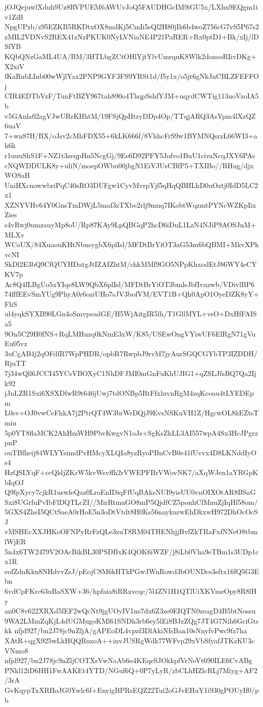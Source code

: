 jOJQejuwlXduh9Uz8RVPUEM6AWUvJoQ5FAUDHGcIM9iGU5x/LXlm9EQgm1iv1ZiB
NpgUPzb/z95EZKB5RKDtxOX8mdKj5CmIi5sQl2H80jIh6b4woZ756cG7vS5P67s2
zMIL2VDNvS2REX41zNzPKUK0NyLVNiaNE4P21PaRER+Rx0ptD1+Bk/xIj/lDSfYB
KQbQNzGaML4UA/BM/3HTLbgZCtOHlYjtYlvUmrquK8Wlk2dozooRIivDKg+X2xiV
fKaRubLIub00wWjlYax2PNP9GYF3FS9YRSt1d/f5y1x/o5jt6gNkJnCBLZFEFFOj
CIR4EDTbVzF/TunFtBZY967tah890o4ThqpSshfYJM+uqydCWTig113uoVzoIA5b
v5GAnla02agVJwURrKHhtM/19FSjQpHtryDDp4Op/TTqjARQ3AsYpm4lXzQZ6uaV
7+wn87H/BX/oJsv2cMhFDX55+6kLK666f/8VhhcFrS9w1BYMNQsrzL66WI3+ah6k
r1uuuShS1F+NZ1t3zeqpHn5NcgGj/9Ee6D92PFY5Jofvo1BuU1civaNcqJXY6PAs
cNQWDDULK8y+uliN/moepOWbu00jbgN1EiVJUsCBfP5+TXIBo//RHug/djxWOSaH
UniHXcnowwbriPqC40sRO3DUFgw1CyvMvrpYjf5qHqQBHLhD0uOztj0IdD5LC2x1
XZNYVHv64Y0GnsTmDWjL5maf3zTXbe2rlj9muq7IKobtWqzmtPYNcWZKpIixZies
s4vRwj0umzauyMp8oU/Rp87KAy9LpQBGqP2hcD6iDuL1LzN4NJiP9AOSJnM+MLXv
WCoUX/84XuaouKHtNbnsygbX6plIsl/MFDtBrYiOT3aG53m6bQBMI+MkvXPkvcNI
SkDl2E3bQ9CfQUYHDatgJtIZAIZhtM/chkMMf9GO5NPpKhxodEtJ86WY4eCYKV7p
Ac8Q4fLBgUo5xYIqe8LW9QbX6plIsl/MFDtBrYiOT3bmlsJbfIvuzwb/VDivlBP6
74fffEEvSmYUg9PhyA0r6oziUHo7sJV3bofVM/EVT1B+Qh0ApO1OyeDZK8yY+FhS
ul4yqkSYXB90LGn4oSmvpeadGE/H5WjAitgIR5lh/T1GllMYL+vsO+DxHfFAISa5
9On5C29H0fNS+RqLMHuzq0kNmE3xW/K85/USEwOngVYiwUF6ElRgN71gVuEu05vz
3uCgAB4j2qOFdfR7WpPHDR/opbR7RwpbJ9rvM7jyAurSGQCGYbTP3IZDDH/RjuTT
7j34wQll6JCCI45YCsVBOXyC1NhDFJMI0mGnFuKhUJIG1+qZSLJfzBQ7Qa2Ijk92
jJnLZR1Sxi6XSXDfwR9t646jUwj7tdONBp5RtFfxluvnRgM4zqKcoau4tLYEDEpm
L0sv+OJ0vwCeFhkA7j2PtrQT4W3brWrDQjJ9EvsNSKuVH1Z/HgcwOL8kEZtsTmiu
5p0YT8flaMCK2AhHmWH9PbvKwgvN1oJs+SgKsZhLL3AI557wpA4Sx3HcJPgrzpnP
ouTBfheij84WLYYsimdPvHMcyXLQIa8yzRyoPBnCvB0e41fUvvx4D8LKNddIyOs4
HzQSLYqF+ccQldjZKrW5kvWsvffh2rVWEPFBrVWovNK7/aXqWJen1aYRGpKbIqOJ
Q9fpXycy7cjkR1uswfeQaz0LroEnIDiqFfUqBAksNUI9yisUU0vnOIXOtAR8BSaG
Sxi8UGrfuPvIbFlDQTLcZI//MirRtmuGO8mP5QjdfCZ5ponhCfMnuZjIqHf58om/
5GXS4ZheI5QCtSaeA0rHoE5n3oDtVtdt8H0Ks56naykurwEhDkxwH972DhOcOcSJ
vMSHEcXXJHKoOFNPyRrFzQLe3zuT8RM04THENhjjBvfZkTRaFxfNNeO8tbmlWjER
5n4x6TW2479V2OAcBikBL30PSDBxK4QOK6iWZF/j8iLb0Vha9eTBm1s3UDp1cx1R
eofZdnKkn8NHdvvZsJ/pEojC8M6kHTkPGwJWnRowd3bOUNDcs3sftx16fQ5G3Ebn
6vdCpFKrc63uBaSXW+36/hpfaia8iRRxvcqc/5l4ZN1H1QTlUiXKVmeOpy8R8lHy
an0C8v622XRXd5fEF2wQcNt9jgUOyIV1ns7dx6Z3ze0EIQTN0zeagD4B5btNossu
9WA2LMmZqKjL4dUGMugoKMl61SNDh3rb6ey5lEi8BJzZQg7JT4G7Nih6GciGtskk
nfjd927/bn2J78jc9nZljA/gAPEoDL4vpzf3DlAkiNfsBan10sNnyfvPwc9fz7ha
XAtR+qgX925wLkHQQRuzoA++invJUSRgWdk77WFvp29xVbSfyafJTKzKU3cVNmo8
nfjd927/bn2J78jc9nZljCOTXsVwNaAb6o4KEqeSJOkkpfVrNeVt690ILE6CvABg
PNkl12iD6HH1FwAAKEt4YTD/NGuf6Q+0P7yLyR/zbCLhHZlcRLj7Miyg+AF2/3rA
GvKqypTxXRHoJG0Ywlc6f+EnyigBPRsEQZ22Tui2oGJvEHuY1i930gPOUyIf0/pb
